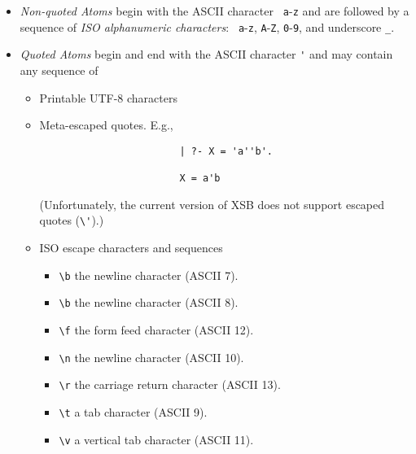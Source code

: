 \begin{itemize}
\item {\em Non-quoted Atoms} begin with the ASCII character {\tt
  a}-{\tt z} and are followed by a sequence of {\em ISO alphanumeric characters}: {\tt
  a}-{\tt z}, {\tt A}-{\tt Z}, {\tt 0}-{\tt 9}, and underscore {\tt \_}.
%
\item {\em Quoted Atoms} begin and end with the ASCII character \verb|'| and may contain any sequence of 
\begin{itemize}
\item Printable UTF-8 characters

\item Meta-escaped quotes.  E.g., 
\begin{verbatim}
                        | ?- X = 'a''b'.

                        X = a'b
\end{verbatim}
(Unfortunately, the current version of XSB does not support escaped
quotes (\verb|\'|).)
\item ISO escape characters and sequences
\begin{itemize}
\item \verb|\b| the newline character (ASCII 7).

\item \verb|\b| the newline character (ASCII 8).

\item \verb|\f| the form feed character (ASCII 12).

\item \verb|\n| the newline character (ASCII 10).

\item \verb|\r| the carriage return character (ASCII 13).

\item \verb|\t| a tab character (ASCII 9).

\item \verb|\v| a vertical tab character (ASCII 11).


\end{itemize}
\end{itemize}
\end{itemize}
